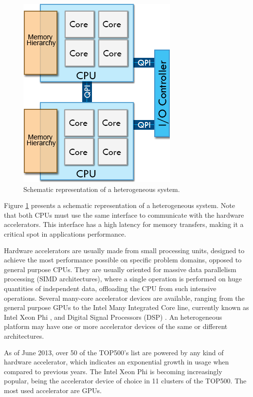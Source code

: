 \begin{figure}[!htp]
	\begin{center}
		\includegraphics[scale=0.5]{../../common/img/numa_qpi.png}
		\caption{Schematic representation of a heterogeneous system.}
		\label{fig:HeterogeneousSystem}
	\end{center}
\end{figure}

Figure \ref{fig:HeterogeneousSystem} presents a schematic representation of a heterogeneous system. Note that both CPUs must use the same interface to communicate with the hardware accelerators. This interface has a high latency for memory transfers, making it a critical spot in applications performance.

Hardware accelerators are usually made from small processing units, designed to achieve the most performance possible on specific problem domains, opposed to general purpose CPUs. They are usually oriented for massive data parallelism processing (SIMD architectures), where a single operation is performed on huge quantities of independent data, offloading the CPU from such intensive operations. Several many-core accelerator devices are available, ranging from the general purpose GPUs to the Intel Many Integrated Core line, currently known as Intel Xeon Phi \cite{Intel:MIC}, and Digital Signal Processors (DSP) \cite{Texas:DSP}. An heterogeneous platform may have one or more accelerator devices of the same or different architectures.

As of June 2013, over 50 of the TOP500’s list \cite{TOP500} are powered by any kind of hardware accelerator, which indicates an exponential growth in usage when compared to previous years. The Intel Xeon Phi is becoming increasingly popular, being the accelerator device of choice in 11 clusters of the TOP500. The most used accelerator are \nvidia GPUs.

